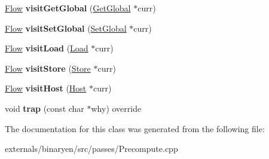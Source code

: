 \begin{DoxyCompactItemize}
\mbox{\hyperlink{classwasm_1_1_flow}{Flow}} {\bfseries visit\+Get\+Global} (\mbox{\hyperlink{classwasm_1_1_get_global}{Get\+Global}} $\ast$curr)
\item 
\mbox{\label{classwasm_1_1_standalone_expression_runner_a9aa108de94ad528c1fc55549b11a9058}} 
\mbox{\hyperlink{classwasm_1_1_flow}{Flow}} {\bfseries visit\+Set\+Global} (\mbox{\hyperlink{classwasm_1_1_set_global}{Set\+Global}} $\ast$curr)
\item 
\mbox{\label{classwasm_1_1_standalone_expression_runner_a78c79d3e6ad799df9300b42fbd5a6656}} 
\mbox{\hyperlink{classwasm_1_1_flow}{Flow}} {\bfseries visit\+Load} (\mbox{\hyperlink{classwasm_1_1_load}{Load}} $\ast$curr)
\item 
\mbox{\label{classwasm_1_1_standalone_expression_runner_a93bcc8832eaa6a4144f5f83c8693c791}} 
\mbox{\hyperlink{classwasm_1_1_flow}{Flow}} {\bfseries visit\+Store} (\mbox{\hyperlink{classwasm_1_1_store}{Store}} $\ast$curr)
\item 
\mbox{\label{classwasm_1_1_standalone_expression_runner_a16529cc4ad08892ff2d0812a481a00e8}} 
\mbox{\hyperlink{classwasm_1_1_flow}{Flow}} {\bfseries visit\+Host} (\mbox{\hyperlink{classwasm_1_1_host}{Host}} $\ast$curr)
\item 
\mbox{\label{classwasm_1_1_standalone_expression_runner_a462ff9582f45c2b0b1b839583f4d57cd}} 
void {\bfseries trap} (const char $\ast$why) override
\end{DoxyCompactItemize}


The documentation for this class was generated from the following file\+:\begin{DoxyCompactItemize}
\item 
externals/binaryen/src/passes/Precompute.\+cpp\end{DoxyCompactItemize}
